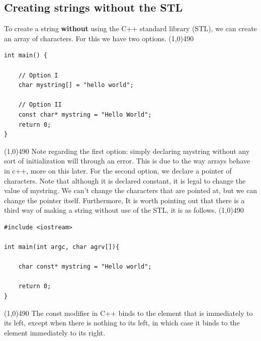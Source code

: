\documentclass{report}
\begin{document}
    \pagebreak \bigbreak \noindent 
    \subsection{Creating strings without the STL}
    To create a string \textbf{without} using the C++ standard library (STL), we can create an array of characters. For this we have two options.
    \bigbreak \noindent 
    \line(1,0){490}
    \begin{verbatim}
int main() {

    // Option I
    char mystring[] = "hello world";

    // Option II
    const char* mystring = "Hello World";
    return 0;
}
    \end{verbatim}
    \line(1,0){490}
    \bigbreak \noindent 
    Note regarding the first option: simply declaring mystring without any sort of initialization will through an error. This is due to the way arrays behave in c++, more on this later.
    \bigbreak \noindent 
    For the second option, we declare a pointer of characters. Note that although it is declared constant, it is legal to change the value of mystring. We can't change the characters that are pointed at, but we can change the pointer itself.
    \bigbreak \noindent 
    Furthermore, It is worth pointing out that there is a third way of making a string without use of the STL, it is as follows.
    \bigbreak \noindent 
    \line(1,0){490}
    \begin{verbatim}
#include <iostream>

int main(int argc, char agrv[]){

    char const* mystring = "Hello world";

    return 0;
}
    \end{verbatim}
    \line(1,0){490}
    \bigbreak \noindent 
    The const modifier in C++ binds to the element that is immediately to its left, except when there is nothing to its left, in which case it binds to the element immediately to its right.
    \bigbreak \noindent 
\end{document}
